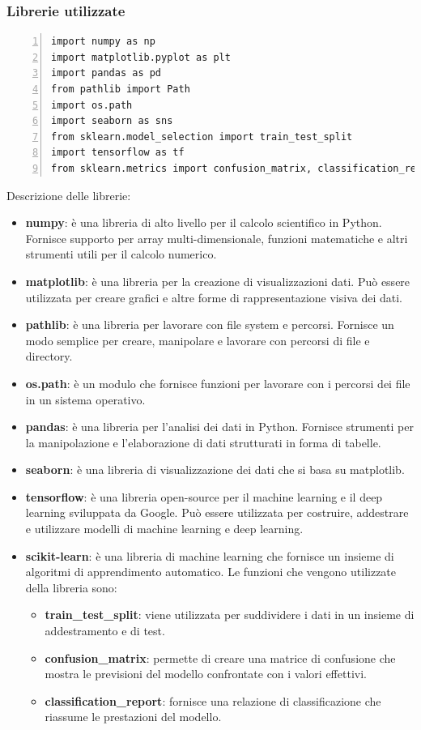 \documentclass[a4paper,final,12pt]{report}
\begin{document}
\subsubsection{Librerie utilizzate}
\begin{lstlisting}[caption={Le librerie utilizzate}, label={lst:librerie_usate}, breaklines, escapechar=`\%, frame=lines, basicstyle=\small\ttfamily, keepspaces=true, numbers=left]
import numpy as np
import matplotlib.pyplot as plt
import pandas as pd
from pathlib import Path
import os.path
import seaborn as sns
from sklearn.model_selection import train_test_split
import tensorflow as tf
from sklearn.metrics import confusion_matrix, classification_report
\end{lstlisting}
Descrizione delle librerie:
\begin{itemize}
    \item \textbf{numpy}: è una libreria di alto livello per il calcolo scientifico in Python. Fornisce supporto per array multi-dimensionale, funzioni matematiche e altri strumenti utili per il calcolo numerico.
    \item \textbf{matplotlib}: è una libreria per la creazione di visualizzazioni dati. Può essere utilizzata per creare grafici e altre forme di rappresentazione visiva dei dati.
    \item \textbf{pathlib}: è una libreria per lavorare con file system e percorsi. Fornisce un modo semplice per creare, manipolare e lavorare con percorsi di file e directory.
    \item \textbf{os.path}: è un modulo che fornisce funzioni per lavorare con i percorsi dei file in un sistema operativo.
    \item \textbf{pandas}: è una libreria per l'analisi dei dati in Python. Fornisce strumenti per la manipolazione e l'elaborazione di dati strutturati in forma di tabelle.
    \item \textbf{seaborn}: è una libreria di visualizzazione dei dati che si basa su matplotlib.
    \item \textbf{tensorflow}: è una libreria open-source per il machine learning e il deep learning sviluppata da Google. Può essere utilizzata per costruire, addestrare e utilizzare modelli di machine learning e deep learning.
    \item \textbf{scikit-learn}: è una libreria di machine learning che fornisce un insieme di algoritmi di apprendimento automatico. Le funzioni che vengono utilizzate della libreria sono:
    \begin{itemize}
        \item \textbf{train\_test\_split}: viene utilizzata per suddividere i dati in un insieme di addestramento e di test.
        \item \textbf{confusion\_matrix}:  permette di creare una matrice di confusione che mostra le previsioni del modello confrontate con i valori effettivi.
        \item \textbf{classification\_report}: fornisce una relazione di classificazione che riassume le prestazioni del modello.
    \end{itemize}
\end{itemize}
\end{document}

